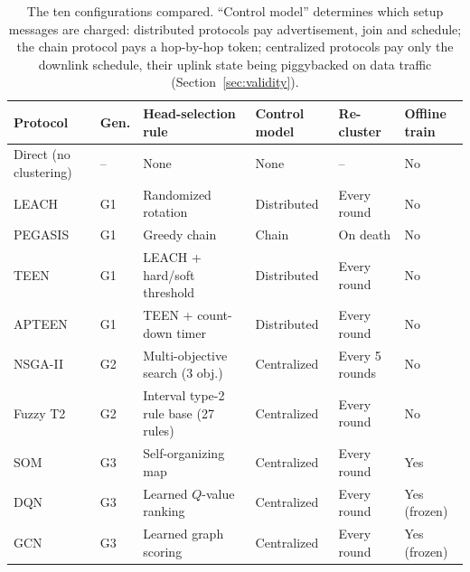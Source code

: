 \begin{table}[!t]
\caption{The ten configurations compared. ``Control model'' determines which setup messages are charged: distributed protocols pay advertisement, join and schedule; the chain protocol pays a hop-by-hop token; centralized protocols pay only the downlink schedule, their uplink state being piggybacked on data traffic (Section~\ref{sec:validity}).}
\label{tab:taxonomy}
\centering
\begin{tabular}{llllll}
\toprule
Protocol & Gen. & Head-selection rule & Control model & Re-cluster & Offline train \\
\midrule
Direct (no clustering) & -- & None & None & -- & No \\
LEACH & G1 & Randomized rotation & Distributed & Every round & No \\
PEGASIS & G1 & Greedy chain & Chain & On death & No \\
TEEN & G1 & LEACH + hard/soft threshold & Distributed & Every round & No \\
APTEEN & G1 & TEEN + count-down timer & Distributed & Every round & No \\
NSGA-II & G2 & Multi-objective search (3 obj.) & Centralized & Every 5 rounds & No \\
Fuzzy T2 & G2 & Interval type-2 rule base (27 rules) & Centralized & Every round & No \\
SOM & G3 & Self-organizing map & Centralized & Every round & Yes \\
DQN & G3 & Learned $Q$-value ranking & Centralized & Every round & Yes (frozen) \\
GCN & G3 & Learned graph scoring & Centralized & Every round & Yes (frozen) \\
\bottomrule
\end{tabular}
\end{table}
